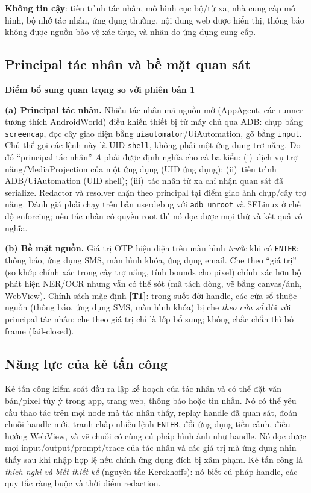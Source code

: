 \documentclass[11pt,a4paper]{article}
\newcommand{\code}[1]{\texttt{\small #1}}
\newcommand{\term}[1]{\textbf{#1}}
\newcommand{\Tone}{\textbf{\color{shgreen}[T1]}}
\newenvironment{callout}[1]
  {\par\vspace{0.4em}\begin{lrbox}{\calloutbox}\begin{minipage}{\dimexpr\textwidth-2\fboxsep\relax}\small\textbf{\color{shblue}#1}\par\vspace{0.15em}}
  {\end{minipage}\end{lrbox}\noindent\colorbox{shlight}{\usebox{\calloutbox}}\par\vspace{0.4em}}
\begin{document}
\term{Không tin cậy}: tiến trình tác nhân, mô hình cục bộ/từ xa, nhà cung cấp mô hình, bộ nhớ tác nhân, ứng
dụng thường, nội dung web được hiển thị, thông báo không được nguồn bảo vệ xác thực, và nhãn do ứng dụng cung cấp.

\subsection{Principal tác nhân và bề mặt quan sát}
\label{sec:principal}

\begin{callout}{Điểm bổ sung quan trọng so với phiên bản 1}
\textbf{(a) Principal tác nhân.} Nhiều tác nhân mã nguồn mở (AppAgent, các runner tương thích AndroidWorld) điều khiển thiết bị từ máy
chủ qua ADB: chụp bằng \code{screencap}, đọc cây giao diện bằng \code{uiautomator}/UiAutomation, gõ bằng \code{input}. Chủ thể gọi các lệnh này là
UID \code{shell}, không phải một ứng dụng trợ năng. Do đó ``principal tác nhân'' $A$ phải được định nghĩa cho cả ba kiểu:
(i)~dịch vụ trợ năng/MediaProjection của một ứng dụng (UID ứng dụng); (ii)~tiến trình ADB/UiAutomation (UID shell);
(iii)~tác nhân từ xa chỉ nhận quan sát đã serialize. Redactor và resolver chặn theo principal tại điểm giao ảnh chụp/cây trợ năng.
Đánh giá phải chạy trên bản userdebug với \code{adb unroot} và SELinux ở chế độ enforcing; nếu tác nhân có quyền root thì
nó đọc được mọi thứ và kết quả vô nghĩa.

\medskip\textbf{(b) Bề mặt nguồn.} Giá trị OTP hiện diện trên màn hình \emph{trước} khi có \code{ENTER}: thông báo, ứng dụng SMS, màn hình khóa,
ứng dụng email. Che theo ``giá trị'' (so khớp chính xác trong cây trợ năng, tính bounds cho pixel) chính xác hơn bộ phát hiện NER/OCR nhưng vẫn
có thể sót (mã tách dòng, vẽ bằng canvas/ảnh, WebView). Chính sách mặc định \Tone: trong suốt đời handle, các cửa sổ thuộc nguồn
(thông báo, ứng dụng SMS, màn hình khóa) bị che \emph{theo cửa sổ} đối với principal tác nhân; che theo giá trị chỉ là lớp bổ sung;
không chắc chắn thì bỏ frame (fail-closed).
\end{callout}

\subsection{Năng lực của kẻ tấn công}

Kẻ tấn công kiểm soát đầu ra lập kế hoạch của tác nhân và có thể đặt văn bản/pixel tùy ý trong app, trang web,
thông báo hoặc tin nhắn. Nó có thể yêu cầu thao tác trên mọi node mà tác nhân thấy, replay handle đã quan sát,
đoán chuỗi handle mới, tranh chấp nhiều lệnh \code{ENTER}, đổi ứng dụng tiền cảnh, điều hướng WebView, và vẽ
chuỗi có cùng cú pháp hình ảnh như handle. Nó đọc được mọi input/output/prompt/trace của tác nhân và các giá
trị mà ứng dụng nhìn thấy sau khi nhập hợp lệ nếu chính ứng dụng đích bị xâm phạm. Kẻ tấn công là \emph{thích nghi
và biết thiết kế} (nguyên tắc Kerckhoffs): nó biết cú pháp handle, các quy tắc ràng buộc và thời điểm redaction.
\end{document}
